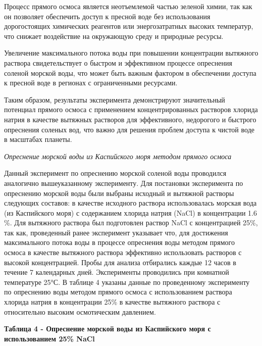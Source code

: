 Процесс прямого осмоса является неотъемлемой частью зеленой химии, так
как он позволяет обеспечить доступ к пресной воде без использования
дорогостоящих химических реагентов или энергозатратных высоких
температур, что снижает воздействие на окружающую среду и природные
ресурсы.

Увеличение максимального потока воды при повышении концентрации
вытяжного раствора свидетельствует о быстром и эффективном процессе
опреснения соленой морской воды, что может быть важным фактором в
обеспечении доступа к пресной воде в регионах с ограниченными ресурсами.

Таким образом, результаты эксперимента демонстрируют значительный
потенциал прямого осмоса с применением концентрированных растворов
хлорида натрия в качестве вытяжных растворов для эффективного,
недорогого и быстрого опреснения соленых вод, что важно для решения
проблем доступа к чистой воде в масштабах планеты.

\emph{Опреснение морской воды из Каспийского моря методом прямого
осмоса}

Данный эксперимент по опреснению морской соленой воды проводился
аналогично вышеуказанному эксперименту. Для постановки эксперимента по
опреснению морской воды были выбраны исходный и вытяжной растворы
следующих составов: в качестве исходного раствора использовалась морская
вода (из Каспийского моря) с содержанием хлорида натрия (NaCl) в
концентрации 1.6 \%. Для вытяжного раствора был подготовлен раствор NaCl
с концентрацией 25\%, так как, проведенный ранее эксперимент указывает
что, для достижения максимального потока воды в процессе опреснения воды
методом прямого осмоса в качестве вытяжного раствора эффективно
использовать растворов с высокой концентрацией. Пробы для анализа
отбирались каждые 12 часов в течение 7 календарных дней. Эксперименты
проводились при комнатной температуре 25°С. В таблице 4 указаны данные
по проведенному эксперименту по опреснению воды методом прямого осмоса с
использованием раствора хлорида натрия в концентрации 25\% в качестве
вытяжного раствора с относительно высоким осмотическим давлением.

{\bfseries Таблица 4 - Опреснение морской воды из Каспийского моря с
использованием 25\% NaCl}

